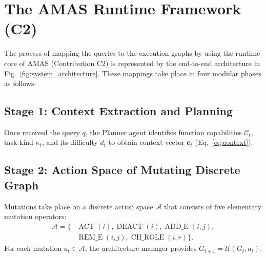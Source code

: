 ﻿\documentclass[conference]{IEEEtran}
\begin{document}
\section{The AMAS Runtime Framework (C2)}
\label{sec:runtime_framework}



The process of mapping the queries to the execution graphs by using the runtime core of AMAS (Contribution C2) is represented by the end-to-end architecture in Fig.~\ref{fig:system_architecture}. These mappings take place in four modular phases as follows:

\subsection{Stage 1: Context Extraction and Planning}
Once received the query $q$, the Planner agent identifies function capabilities $\mathcal{C}_t$, task kind $\kappa_t$, and its difficulty $d_t$ to obtain context vector $\mathbf{c}_t$ (Eq.~\eqref{eq:context}).

\subsection{Stage 2: Action Space of Mutating Discrete Graph}
Mutations take place on a discrete action space $\mathcal{A}$ that consists of five elementary mutation operators:
\begin{equation}
\begin{aligned}
\mathcal{A} = \{ & \operatorname{ACT}(i), \operatorname{DEACT}(i), \operatorname{ADD\_E}(i,j),\\
& \operatorname{REM\_E}(i,j), \operatorname{CH\_ROLE}(i,r) \}.
\end{aligned}
\end{equation}
For each mutation $a_t \in \mathcal{A}$, the architecture manager provides $\widetilde{G}_{t+1} = \mathcal{U}(G_t, a_t)$.
\end{document}
